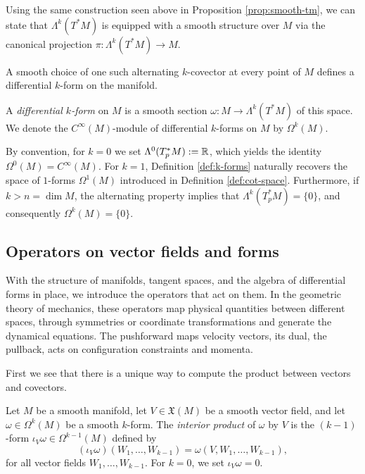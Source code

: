 Using the same construction seen above in Proposition \ref{prop:smooth-tm}, we can state that $\Lambda^k(T^*M)$ is equipped with a smooth structure over $M$ via the canonical projection $\pi: \Lambda^k(T^*M) \to M$.

\noindent A smooth choice of one such alternating $k$-covector at every point of $M$ defines a differential $k$-form on the manifold.

\begin{definition}\label{def:k-forms}
	A \emph{differential $k$-form} on $M$ is a smooth section $\omega: M \to \Lambda^k(T^*M)$ of this space. We denote the $C^\infty(M)$-module of differential $k$-forms on $M$ by $\Omega^k(M)$.
\end{definition}

\begin{remark}\label{rem:forms-conventions}
	By convention, for $k = 0$ we set $\Lambda^0(T_p^*M) := \mathbb{R}$, which yields the identity $\Omega^0(M) = C^\infty(M)$. For $k = 1$, Definition \ref{def:k-forms} naturally recovers the space of $1$-forms $\Omega^1(M)$ introduced in Definition \ref{def:cot-space}. Furthermore, if $k > n = \dim M$, the alternating property implies that $\Lambda^k(T_p^*M) = \{0\}$, and consequently $\Omega^k(M) = \{0\}$.
\end{remark}


\subsection*{Operators on vector fields and forms}
With the structure of manifolds, tangent spaces, and the algebra of differential forms in place, we introduce the operators that act on them. In the geometric theory of mechanics, these operators map physical quantities between different spaces, through symmetries or coordinate transformations and generate the dynamical equations. The pushforward maps velocity vectors, its dual, the pullback, acts on configuration constraints and momenta.

First we see that there is a unique way to compute the product between vectors and covectors.

\begin{definition}
	Let $M$ be a smooth manifold, let $V \in \mathfrak{X}(M)$ be a smooth vector field, and let $\omega \in \Omega^k(M)$ be a smooth $k$-form. The \emph{interior product} of $\omega$ by $V$ is the $(k-1)$-form $\iota_V\omega \in \Omega^{k-1}(M)$ defined by
	\[
	(\iota_V\omega)(W_1,\dots,W_{k-1}) = \omega(V,W_1,\dots,W_{k-1}),
	\]
	for all vector fields $W_1,\dots,W_{k-1}$. For $k=0$, we set $\iota_V\omega = 0$.
\end{definition}

